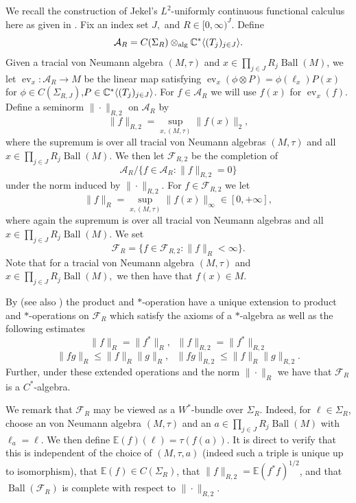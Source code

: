 \documentclass[10pt]{amsart}
\theoremstyle{definition}
\numberwithin{equation}{section}
\newcommand{\bC}{{\mathbb C}}
\newcommand{\bE}{{\mathbb E}}
\newcommand{\cF}{{\mathcal F}}
\DeclareMathOperator{\ev}{ev}
\DeclareMathOperator{\Ball}{Ball}
\DeclarePairedDelimiter{\ip}{\langle}{\rangle}
\begin{document}
We recall the construction of Jekel's $L^{2}$-uniformly continuous functional calculus here as given in \cite{FreePinsker, JekelThesis}. Fix an index set $J,$ and $R\in [0,\infty)^{J}.$
Define
\[\mathcal{A}_{R}=C(\Sigma_{R})\otimes_{\textnormal{alg}}\bC^{*}\ip{(T_{j})_{j\in J}}.\]
Given a tracial von Neumann algebra $(M,\tau)$ and $x\in \prod_{j\in J}R_{j}\Ball(M)$, we let $\ev_{x}\colon \mathcal{A}_{R}\to M$ be the linear map satisfying $\ev_{x}(\phi\otimes P)=\phi(\ell_{x})P(x)$ for $\phi \in C(\Sigma_{R,J})$,$P\in \bC^{*}\ip{(T_{j})_{j\in J}}$. For $f\in \mathcal{A}_{R}$ we will use $f(x)$ for $\ev_{x}(f).$
Define a seminorm $\|\cdot\|_{R,2}$ on $\mathcal{A}_{R}$ by
\[\|f\|_{R,2}=\sup_{x,(M,\tau)}\|f(x)\|_{2},\]
where the supremum is over all tracial von Neumann algebras $(M,\tau)$ and all $x\in \prod_{j\in J}R_{j}\Ball(M).$ We then let $\mathcal{F}_{R,2}$ be the completion of
\[\mathcal{A}_{R}/\{f\in \mathcal{A}_{R}:\|f\|_{R,2}=0\}\]
under the norm induced by $\|\cdot\|_{R,2}.$  For $f\in \mathcal{F}_{R,2}$ we let
\[\|f\|_{R}=\sup_{x, (M,\tau)}\|f(x)\|_{\infty}\in [0,+\infty],\]
where again the supremum is over all tracial von Neumann algebras and all $x\in \prod_{j\in J}R_{j}\Ball(M)$. We set
\[\mathcal{F}_{R}=\{f\in \mathcal{F}_{R,2}:\|f\|_{R}<\infty\}.\]
Note that for a tracial von Neumann algebra $(M,\tau)$ and $x\in \prod_{j\in J}R_{j}\Ball(M),$ we then have that $f(x)\in M.$


By \cite[Section 3.1]{FreePinsker} (see also \cite[Section 2.4]{HayesPT}) the  product and   $*$-operation have a unique extension to product and $*$-operations on $\mathcal{F}_{R}$ which satisfy the axioms of a $*$-algebra as well as the following estimates
 \[\|f\|_{R}=\|f^{*}\|_{R},\,\,\ \|f\|_{R,2}=\|f^{*}\|_{R,2}\]
 \[\|fg\|_{R}\leq \|f\|_{R}\|g\|_{R},\,\,\,\, \|fg\|_{R,2}\leq \|f\|_{R}\|g\|_{R,2}.\]
Further, under these extended operations and the norm $\|\cdot\|_{R}$ we have that $\cF_{R}$ is a $C^{*}$-algebra.

We remark that $\cF_{R}$ may be viewed as a $W^{*}$-bundle over $\Sigma_{R}$. Indeed, for $\ell\in \Sigma_{R}$, choose an von Neumann algebra $(M,\tau)$ and an $a\in \prod_{j\in J}R_{j}\Ball(M)$ with $\ell_{a}=\ell$. We then define $\bE(f)(\ell)=\tau(f(a))$. It is direct to verify that this is independent of the choice of $(M,\tau,a)$ (indeed such a triple is unique up to isomorphism), that $\bE(f)\in C(\Sigma_{R})$, that $\|f\|_{R,2}=\bE(f^{*}f)^{1/2}$, and that $\Ball(\cF_{R})$ is complete with respect to $\|\cdot\|_{R,2}$. 
\end{document}
